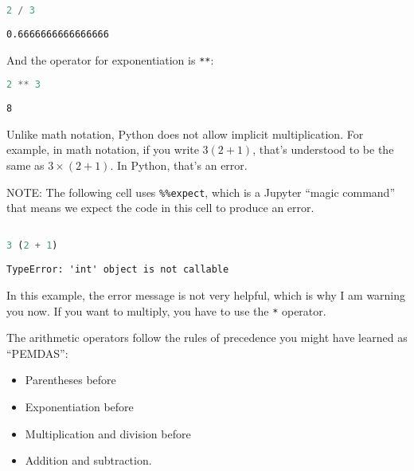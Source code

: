 \begin{lstlisting}[language=Python,style=source]
2 / 3
\end{lstlisting}

\begin{lstlisting}[style=output]
0.6666666666666666
\end{lstlisting}

And the operator for exponentiation is \passthrough{\lstinline!**!}:

\begin{lstlisting}[language=Python,style=source]
2 ** 3
\end{lstlisting}

\begin{lstlisting}[style=output]
8
\end{lstlisting}

Unlike math notation, Python does not allow implicit multiplication. For
example, in math notation, if you write \(3 (2 + 1)\), that's understood
to be the same as \(3 \times (2+ 1)\). In Python, that's an error.

NOTE: The following cell uses \passthrough{\lstinline!\%\%expect!},
which is a Jupyter ``magic command'' that means we expect the code in
this cell to produce an error.

\begin{lstlisting}[language=Python,style=source]
%%expect TypeError

3 (2 + 1)
\end{lstlisting}

\begin{lstlisting}[style=output]
TypeError: 'int' object is not callable
\end{lstlisting}

In this example, the error message is not very helpful, which is why I
am warning you now. If you want to multiply, you have to use the
\passthrough{\lstinline!*!} operator.

The arithmetic operators follow the rules of precedence you might have
learned as ``PEMDAS'':

\begin{itemize}

\item
  Parentheses before
\item
  Exponentiation before
\item
  Multiplication and division before
\item
  Addition and subtraction.
\end{itemize}

